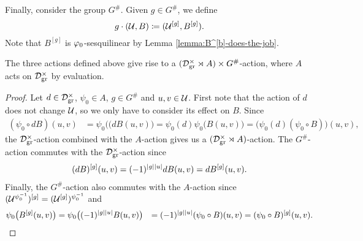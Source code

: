 Finally, consider the group $G^\#$. 
Given $g \in G^\#$, we define
\begin{equation}\label{eq:G-action}
    g \cdot (\mathcal U, B) \coloneqq (\mathcal U^{[g]}, B^{[g]}).
\end{equation}
Note that $B^{[g]}$ is $\varphi_0$-sesquilinear by Lemma \ref{lemma:B^[b]-does-the-job}.

\begin{lemma}\label{lemma:action-on-(U,B)}
    The three actions defined above give rise to a $(\mathcal{D}^\times_{\mathrm{gr}} \rtimes A) \times G^\#$-action, where $A$ acts on $\mathcal{D}^\times_{\mathrm{gr}}$ by evaluation. 
\end{lemma}

\begin{proof}
    Let $d\in \mathcal{D}^\times_{\mathrm{gr}}$, $\psi_0 \in A$, $g \in G^\#$ and $u, v \in \mathcal U$. 
    First note that the action of $d$ does not change $\mathcal U$, so we only have to consider its effect on $B$. 
    Since 
    \begin{align*}
        (\psi_0 \circ dB)(u,v) &= \psi_0 \big( (d B(u,v) \big) = \psi_0 (d) \psi_0 \big( B(u,v) \big) = \big( \psi_0(d) (\psi_0 \circ B) \big) (u,v),
    \end{align*}
    the $\mathcal{D}^\times_{\mathrm{gr}}$-action combined with the $A$-action gives us a $(\mathcal{D}^\times_{\mathrm{gr}} \rtimes A)$-action. 
    The $G^\#$-action commutes with the $\mathcal{D}^\times_{\mathrm{gr}}$-action since 
    \begin{align*}
        (dB)^{[g]} (u, v) = (-1)^{|g||u|} dB(u,v) = d B^{[g]}(u,v).
    \end{align*}
    Finally, the $G^\#$-action also commutes with the $A$-action since $(\mathcal U^{\psi_0^{-1}})^{[g]} = (\mathcal U^{[g]})^{\psi_0^{-1}}$ and 
    \begin{align*}
        \psi_0 \big(B^{[g]} (u,v) \big) 
        &= \psi_0 \big( (-1)^{|g||u|} B(u,v) \big)
        &= (-1)^{|g||u|} (\psi_0 \circ B) (u,v) = (\psi_0 \circ B)^{[g]} (u,v).
    \end{align*}
\end{proof}



